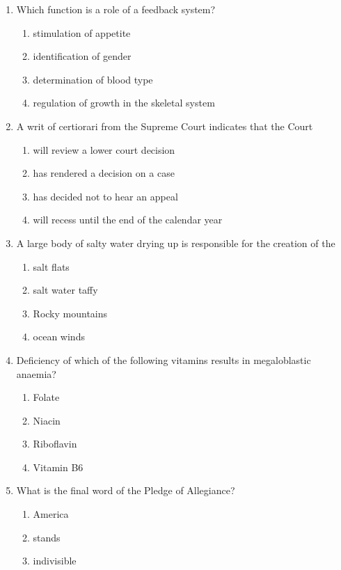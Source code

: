 \documentclass[12pt]{article}
\begin{document}
\begin{enumerate}[label=\arabic*.]
\begin{enumerate}[label=(\alph*)]
    \item we harm the patient.
\end{enumerate}
\item Which function is a role of a feedback system?
\begin{enumerate}[label=(\alph*)]
    \item stimulation of appetite
    \item identification of gender
    \item determination of blood type
    \item regulation of growth in the skeletal system
\end{enumerate}
\item A writ of certiorari from the Supreme Court indicates that the Court
\begin{enumerate}[label=(\alph*)]
    \item will review a lower court decision
    \item has rendered a decision on a case
    \item has decided not to hear an appeal
    \item will recess until the end of the calendar year
\end{enumerate}
\item A large body of salty water drying up is responsible for the creation of the
\begin{enumerate}[label=(\alph*)]
    \item salt flats
    \item salt water taffy
    \item Rocky mountains
    \item ocean winds
\end{enumerate}
\item Deficiency of which of the following vitamins results in megaloblastic anaemia?
\begin{enumerate}[label=(\alph*)]
    \item Folate
    \item Niacin
    \item Riboflavin
    \item Vitamin B6
\end{enumerate}
\item What is the final word of the Pledge of Allegiance?
\begin{enumerate}[label=(\alph*)]
    \item America
    \item stands
    \item indivisible

\end{enumerate}
\end{enumerate}
\end{document}
